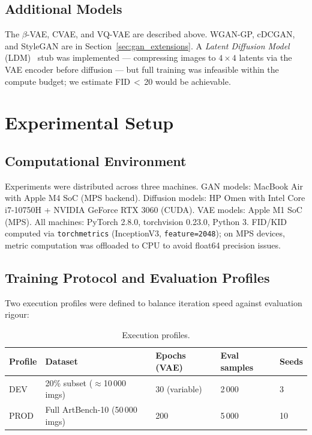 \documentclass[runningheads]{llncs}
\begin{document}
\subsection{Additional Models}\label{sec:extra}

The $\beta$-VAE, CVAE, and VQ-VAE are described above. WGAN-GP, cDCGAN, and StyleGAN are in Section~\ref{sec:gan_extensions}. A \emph{Latent Diffusion Model} (LDM)~\cite{rombach2022} stub was implemented — compressing images to $4{\times}4$ latents via the VAE encoder before diffusion — but full training was infeasible within the compute budget; we estimate FID\,$<$\,20 would be achievable.

\section{Experimental Setup}\label{sec:setup}

\subsection{Computational Environment}

Experiments were distributed across three machines. GAN models: MacBook Air with Apple M4 SoC (MPS backend). Diffusion models: HP Omen with Intel Core i7-10750H + NVIDIA GeForce RTX 3060 (CUDA). VAE models: Apple M1 SoC (MPS). All machines: PyTorch 2.8.0, torchvision 0.23.0, Python 3. FID/KID computed via \texttt{torchmetrics} (InceptionV3, \texttt{feature=2048}); on MPS devices, metric computation was offloaded to CPU to avoid float64 precision issues.

\subsection{Training Protocol and Evaluation Profiles}\label{sec:profiles}

Two execution profiles were defined to balance iteration speed against evaluation rigour:

\begin{table}[htbp]
\caption{Execution profiles.}\label{tab:profiles}
\centering
\begin{tabular}{lllll}
\toprule
Profile & Dataset & Epochs (VAE) & Eval samples & Seeds \\
\midrule
DEV  & 20\% subset ($\approx$10\,000 imgs) & 30 (variable) & 2\,000 & 3 \\
PROD & Full ArtBench-10 (50\,000 imgs)    & 200           & 5\,000 & 10 \\
\bottomrule
\end{tabular}
\end{table}
\end{document}
